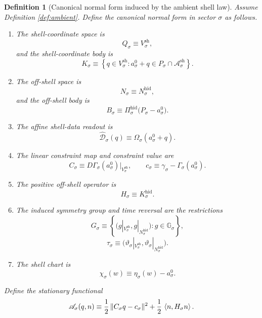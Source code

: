 \documentclass[11pt]{article}
\newcommand{\CoordSpace}[1]{Q_{#1}}
\newcommand{\CoordBody}[1]{K_{#1}}
\newcommand{\NormalSpace}[1]{N_{#1}}
\newcommand{\NormalBody}[1]{B_{#1}}
\newcommand{\AffineData}[1]{\widehat{\mathcal D}_{#1}}
\newcommand{\ConstraintMap}[1]{C_{#1}}
\newcommand{\ConstraintValue}[1]{c_{#1}}
\newcommand{\NormalOperator}[1]{H_{#1}}
\newcommand{\SymGroup}[1]{G_{#1}}
\newcommand{\TimeRev}[1]{\tau_{#1}}
\newcommand{\ShellChart}[1]{\chi_{#1}}
\newcommand{\StationaryFunctional}[1]{\mathscr A_{#1}}
\newcommand{\AmbientBody}[1]{P_{#1}}
\newcommand{\AmbientRead}[1]{\Omega_{#1}}
\newcommand{\AmbientShellLaw}[1]{\Gamma_{#1}}
\newcommand{\AmbientValue}[1]{\gamma_{#1}}
\newcommand{\AmbientSym}[1]{\mathbb G_{#1}}
\newcommand{\AmbientTime}[1]{\vartheta_{#1}}
\newcommand{\ShellAffine}[1]{\mathcal A_{#1}^{\mathrm{sh}}}
\newcommand{\ShellVector}[1]{V_{#1}^{\mathrm{sh}}}
\newcommand{\HiddenSpace}[1]{N_{#1}^{\mathrm{hid}}}
\newcommand{\HiddenOperator}[1]{K_{#1}^{\mathrm{hid}}}
\newcommand{\HiddenProj}[1]{\Pi_{#1}^{\mathrm{hid}}}
\newcommand{\AmbientEmbed}[1]{\eta_{#1}}
\newcommand{\AmbientRef}[1]{a_{#1}^{0}}
\newtheorem{definition}{Definition}
\begin{document}
\begin{definition}[Canonical normal form induced by the ambient shell law]
\label{def:canonical}
Assume Definition \ref{def:ambient}. Define the canonical normal form in sector \(\sigma\) as follows.
\begin{enumerate}
    \item The shell-coordinate space is
    \[
    \CoordSpace{\sigma}\equiv \ShellVector{\sigma},
    \]
    and the shell-coordinate body is
    \begin{equation}
    \CoordBody{\sigma}
    \equiv
    \left\{
    q\in \ShellVector{\sigma}:
    \AmbientRef{\sigma}+q\in
    \AmbientBody{\sigma}\cap \ShellAffine{\sigma}
    \right\}.
    \label{eq:Kdef}
    \end{equation}
    \item The off-shell space is
    \[
    \NormalSpace{\sigma}\equiv \HiddenSpace{\sigma},
    \]
    and the off-shell body is
    \begin{equation}
    \NormalBody{\sigma}
    \equiv
    \HiddenProj{\sigma}\bigl(\AmbientBody{\sigma}-\AmbientRef{\sigma}\bigr).
    \label{eq:Bdef}
    \end{equation}
    \item The affine shell-data readout is
    \begin{equation}
    \AffineData{\sigma}(q)
    \equiv
    \AmbientRead{\sigma}(\AmbientRef{\sigma}+q).
    \label{eq:Dhatdef}
    \end{equation}
    \item The linear constraint map and constraint value are
    \begin{equation}
    \ConstraintMap{\sigma}
    \equiv
    D\AmbientShellLaw{\sigma}(\AmbientRef{\sigma})\big|_{\ShellVector{\sigma}},
    \qquad
    \ConstraintValue{\sigma}
    \equiv
    \AmbientValue{\sigma}-\AmbientShellLaw{\sigma}(\AmbientRef{\sigma}).
    \label{eq:Cdef}
    \end{equation}
    \item The positive off-shell operator is
    \[
    \NormalOperator{\sigma}\equiv \HiddenOperator{\sigma}.
    \]
    \item The induced symmetry group and time reversal are the restrictions
    \[
    \SymGroup{\sigma}
    \equiv
    \left\{
    \bigl(g|_{\ShellVector{\sigma}},g|_{\HiddenSpace{\sigma}}\bigr):
    g\in \AmbientSym{\sigma}
    \right\},
    \]
    \[
    \TimeRev{\sigma}
    \equiv
    \bigl(
    \AmbientTime{\sigma}|_{\ShellVector{\sigma}},
    \AmbientTime{\sigma}|_{\HiddenSpace{\sigma}}
    \bigr).
    \]
    \item The shell chart is
    \begin{equation}
    \ShellChart{\sigma}(w)
    \equiv
    \AmbientEmbed{\sigma}(w)-\AmbientRef{\sigma}.
    \label{eq:chidef}
    \end{equation}
\end{enumerate}
Define the stationary functional
\begin{equation}
\StationaryFunctional{\sigma}(q,n)
\equiv
\frac12\,
\|\ConstraintMap{\sigma}q-\ConstraintValue{\sigma}\|^{2}
+
\frac12\,
\ev{n,\NormalOperator{\sigma}n}.
\label{eq:Adef}
\end{equation}
\end{definition}
\end{document}
